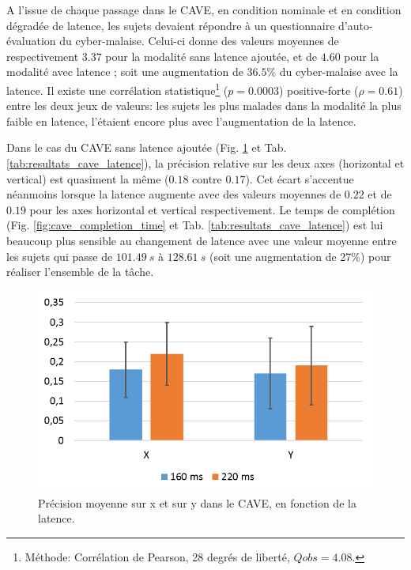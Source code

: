 	\par A l'issue de chaque passage dans le CAVE, en condition nominale et en condition dégradée de latence, les sujets devaient répondre à un questionnaire d'auto-évaluation du cyber-malaise. Celui-ci donne des valeurs moyennes de respectivement $3.37$ pour la modalité sans latence ajoutée, et de $4.60$ pour la modalité avec latence ; soit une augmentation de $36.5\%$ du cyber-malaise avec la latence. Il existe une corrélation statistique\footnote{Méthode: Corrélation de Pearson, 28 degrés de liberté, $Qobs = 4.08$.} ($p = 0.0003$) positive-forte ($\rho = 0.61$) entre les deux jeux de valeurs: les sujets les plus malades dans la modalité la plus faible en latence, l'étaient encore plus avec l'augmentation de la latence.
	
	\par Dans le cas du CAVE sans latence ajoutée (Fig. \ref{fig:cave_precision} et Tab. \ref{tab:resultats_cave_latence}), la précision relative sur les deux axes (horizontal et vertical) est quasiment la même ($0.18$ contre $0.17$). Cet écart s'accentue néanmoins lorsque la latence augmente avec des valeurs moyennes de $0.22$ et de $0.19$ pour les axes horizontal et vertical respectivement. Le temps de complétion (Fig. \ref{fig:cave_completion_time} et Tab. \ref{tab:resultats_cave_latence}) est lui beaucoup plus sensible au changement de latence avec une valeur moyenne entre les sujets qui passe de $101.49~s$ à $128.61~s$ (soit une augmentation de 27\%) pour réaliser l'ensemble de la tâche.

	\begin{figure}
		\centering
		\includegraphics[width=0.8\linewidth]{Figures/CavePrecisionResults.png}
		\caption{Précision moyenne sur x et sur y dans le CAVE, en fonction de la latence.}
		\label{fig:cave_precision}
	\end{figure}
	
